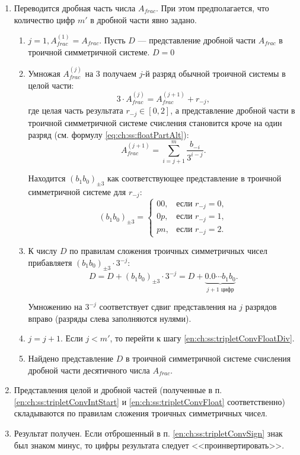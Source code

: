 \begin{enumerate}
    \item\label{en:ch:ss:tripletConvFloat} Переводится дробная часть числа $A_{frac}$. При этом предполагается, что количество цифр $m'$ в дробной части явно задано.
    \begin{enumerate}
        \item $j=1,A_{frac}^{(1)}=A_{frac}$. Пусть $D$ --- представление дробной части $A_{frac}$ в троичной симметричной системе. $D=0$

        \item\label{en:ch:ss:tripletConvFloatDiv}
        Умножая $A_{frac}^{(j)}$ на $3$ получаем $j$-й разряд обычной троичной системы в целой части: 
        \[
            3\cdot A_{frac}^{(j)}= A_{frac}^{(j+1)} + r_{-j},
        \]
        где целая часть результата $r_{-j}\in[0,2]$, а представление дробной части в троичной симметричной системе счисления становится кроче на один разряд (см. формулу \eqref{eq:ch:ss:floatPartAlt}):
        \[
            A_{frac}^{(j+1)} = \sum_{i=j+1}^{m}\frac{b_{-i}}{3^{i-j}}.
        \]

        Находится $(b_1b_0)_{\pm 3}$ как соответствующее представление в троичной симметричной системе для $r_{-j}$: 
        \[
            (b_1b_0)_{\pm 3}=
            \begin{cases}
                00, &\text{если $r_{-j}=0$},\\
                0p, &\text{если $r_{-j}=1$},\\
                pn, &\text{если $r_{-j}=2$}.
            \end{cases}
        \]
        
        \item К числу $D$ по правилам сложения троичных симметричных чисел прибавляетя $(b_1b_0)_{\pm 3}\cdot 3^{-j}$:
        \[
            D=D+(b_1b_0)_{\pm 3}\cdot 3^{-j}=D+\underbrace{0.0\cdots b_1b_0}_{\text{$j+1$ цифр}}.
        \]
        
        Умножению на $3^{-j}$ соответствует сдвиг представления на $j$ разрядов вправо (разряды слева заполняются нулями). 
        
        \item $j=j+1$. Если $j<m'$, то перейти к шагу \ref{en:ch:ss:tripletConvFloatDiv}.

        \item Найдено представление $D$ в троичной симметричной системе счисления дробной части десятичного числа $A_{frac}$.
    \end{enumerate}

    \item Представления целой и дробной частей (полученные в п. \ref{en:ch:ss:tripletConvIntStart} и \ref{en:ch:ss:tripletConvFloat} соответственно) складываются по правилам сложения троичных симметричных чисел.
    
    \item Результат получен. Если отброшенный в п. \ref{en:ch:ss:tripletConvSign} знак был знаком минус, то цифры результата следует <<проинвертировать>>.
\end{enumerate}

